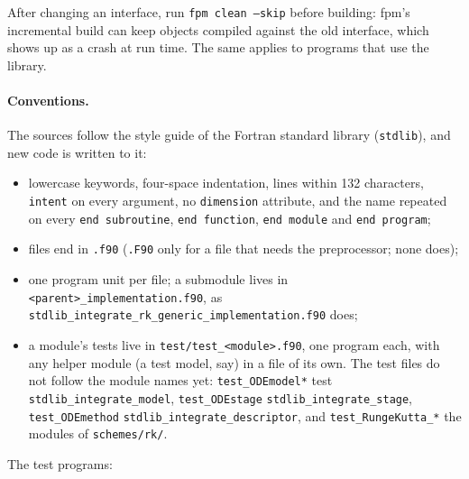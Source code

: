 \documentclass[11pt,a4paper]{article}
\newcommand{\code}[1]{\texttt{#1}}
\begin{document}
After changing an interface, run \code{fpm clean --skip} before building:
fpm's incremental build can keep objects compiled against the old interface,
which shows up as a crash at run time. The same applies to programs that use
the library.

\paragraph{Conventions.} The sources follow the style guide of the Fortran
standard library (\code{stdlib}), and new code is written to it:
\begin{itemize}
  \item lowercase keywords, four-space indentation, lines within 132
    characters, \code{intent} on every argument, no \code{dimension}
    attribute, and the name repeated on every \code{end subroutine},
    \code{end function}, \code{end module} and \code{end program};
  \item files end in \code{.f90} (\code{.F90} only for a file that needs the
    preprocessor; none does);
  \item one program unit per file; a submodule lives in
    \code{<parent>\_implementation.f90}, as
    \code{stdlib\_integrate\_rk\_generic\_implementation.f90} does;
  \item a module's tests live in \code{test/test\_<module>.f90}, one program
    each, with any helper module (a test model, say) in a file of its own.
    The test files do not follow the module names yet:
    \code{test\_ODEmodel*} test \code{stdlib\_integrate\_model},
    \code{test\_ODEstage} \code{stdlib\_integrate\_stage},
    \code{test\_ODEmethod} \code{stdlib\_integrate\_descriptor}, and
    \code{test\_RungeKutta\_*} the modules of \code{schemes/rk/}.
\end{itemize}
The test programs:
\end{document}
